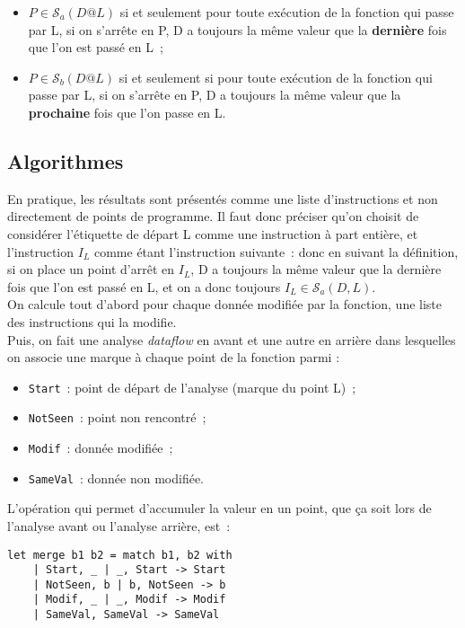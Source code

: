 \documentclass[a4paper,twoside]{article}
\newcommand{\sca}{\mathcal{S}_a}
\newcommand{\scb}{\mathcal{S}_b}
\begin{document}
\begin{itemize}
  \item $P \in \sca(D@L)$ si et seulement pour toute exécution de la fonction
    qui passe par L, si on s'arrête en P,
    D a toujours la même valeur 
    que la {\bf dernière} fois que l'on est passé en L~;
  \item $P \in \scb(D@L)$ si et seulement si pour toute exécution
    de la fonction qui passe par L, si on s'arrête en P,
    D a toujours la même valeur que 
    la {\bf prochaine} fois que l'on passe en L.
\end{itemize}

\subsection{Algorithmes}

En pratique, les résultats sont présentés comme une liste d'instructions et non
directement de points de programme. Il faut donc préciser
qu'on choisit de considérer l'étiquette de départ L comme une instruction 
à part entière, et l'instruction $I_L$ comme étant l'instruction suivante~:
donc en suivant la définition, si on place un point d'arrêt en $I_L$,
D a toujours la même valeur que la dernière fois que l'on est passé en L,
et on a donc toujours $I_L \in \sca(D,L)$.\\

On calcule tout d'abord pour chaque donnée modifiée par la fonction,
une liste des instructions qui la modifie.\\

Puis, on fait une analyse {\it dataflow} en avant et une autre en arrière
dans lesquelles on associe une marque à chaque point de la fonction parmi :

\begin{itemize}
  \item {\tt Start}~: point de départ de l'analyse (marque du point L)~;
  \item {\tt NotSeen}~: point non rencontré~;
  \item {\tt Modif}~: donnée modifiée~;
  \item {\tt SameVal}~: donnée non modifiée.\\
\end{itemize}

L'opération qui permet d'accumuler la valeur en un point, que ça soit lors de
l'analyse avant ou l'analyse arrière, est~:
\begin{verbatim}
let merge b1 b2 = match b1, b2 with
    | Start, _ | _, Start -> Start
    | NotSeen, b | b, NotSeen -> b
    | Modif, _ | _, Modif -> Modif
    | SameVal, SameVal -> SameVal
\end{verbatim}
\end{document}

